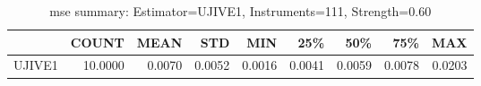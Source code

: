 \begin{table}[ht]
\centering
\caption{mse summary: Estimator=UJIVE1, Instruments=111, Strength=0.60}
\begin{tabular}{lrrrrrrrr}
\toprule
 & COUNT & MEAN & STD & MIN & 25\% & 50\% & 75\% & MAX \\
\midrule
UJIVE1 & 10.0000 & 0.0070 & 0.0052 & 0.0016 & 0.0041 & 0.0059 & 0.0078 & 0.0203 \\
\bottomrule
\end{tabular}
\end{table}
